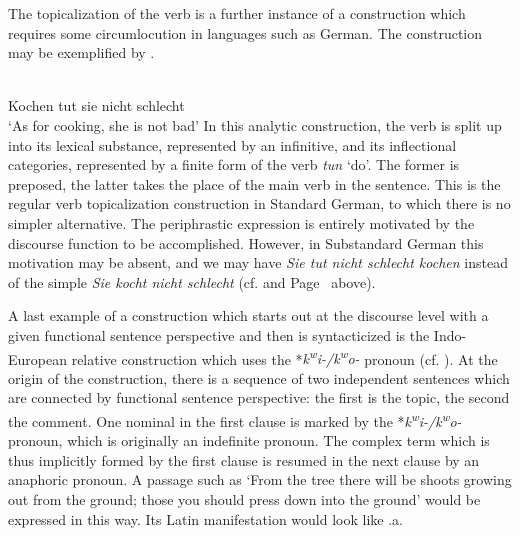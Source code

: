 The topicalization of the verb is a further instance of a construction which requires some circumlocution in languages such as German. The construction may be exemplified by .

\ea \label{ex:E95}
\langinfo{\LangGerm}\\
 Kochen tut sie nicht schlecht\\
\glt ‘As for cooking, she is not bad’
\z
\noindent In this analytic construction, the verb is split up into its lexical substance, represented by an infinitive, and its inflectional categories, represented by a finite form of the verb \textit{tun} ‘do’. The former is preposed, the latter takes the place of the main verb in the sentence. This is the regular verb topicalization construction in Standard German, to which there is no simpler alternative. The periphrastic expression is entirely motivated by the discourse function to be accomplished.\label{page123} However, in Substandard German this motivation may be absent, and we may have \textit{Sie tut nicht schlecht kochen} instead of the simple \textit{Sie kocht nicht schlecht} (cf. \citealt[156]{Ronneberger-Sibold1980} and Page~\pageref{page35}\chk%
  above).

A last example of a construction which starts out at the discourse level with a given functional sentence perspective and then is syntacticized is the Indo-European relative construction which uses the *\textit{k}\textit{\textsuperscript{w}}\textit{i-/k}\textit{\textsuperscript{w}}\textit{o-} pronoun (cf. \citealt[Ch. \textsc{vi}.1]{Lehmann1984}). At the origin of the construction, there is a sequence of two independent sentences which are connected by functional sentence perspective: the first is the topic, the second the comment. One nominal in the first clause is marked by the *\textit{k}\textit{\textsuperscript{w}}\textit{i-/k}\textit{\textsuperscript{w}}\textit{o-} pronoun, which is originally an indefinite pronoun. The complex term which is thus implicitly formed by the first clause  is resumed in the next clause by an anaphoric pronoun. A passage such as ‘From the tree there will be shoots growing out from the ground; those you should press down into the ground’ would be expressed in this way. Its Latin manifestation would look like .a.

